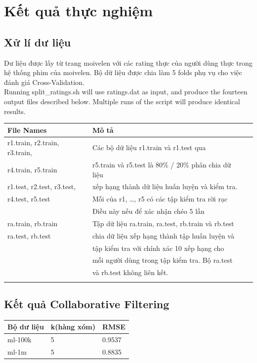 \documentclass[a4paper,11pt]{report}
\begin{document}
\chapter{Kết quả thực nghiệm}
\section{Xử lí dư liệu}
Dư liệu được lấy từ  trang moivelen với các rating thực của người dùng thực trong hệ thống phim của moivelen. Bộ dữ liệu được chia làm 5 folds phụ vụ cho việc đánh giá Cross-Validation. \\
Running split\_ratings.sh will use ratings.dat as input, and produce the fourteen output files described below. Multiple runs of the script will produce identical results. \\
\begin{center}
\begin{longtable}{|l|l|l|} 
\hline
File Names & Mô tả  \\
\hline
r1.train, r2.train, r3.train, & Các bộ dữ liệu r1.train và r1.test qua \\
r4.train, r5.train &  r5.train và r5.test là 80\% / 20\% phân chia dữ liệu \\
r1.test, r2.test, r3.test, & xếp hạng thành dữ liệu huấn luyện và kiểm tra. \\
r4.test, r5.test & Mỗi của r1, \ldots, r5 có các tập kiểm tra rời rạc \\
& Điều này nếu để xác nhận chéo 5 lần \\
\hline
ra.train, rb.train & Tập dữ liệu ra.train, ra.test, rb.train và rb.test\\ 
ra.test, rb.test & chia dữ liệu xếp hạng thành tập huấn luyện và \\
				& tập kiểm tra với chính xác 10 xếp hạng cho\\
				&  mỗi người dùng trong tập kiểm tra. Bộ ra.test \\
				&  và rb.test không liên kết.\\
				& \\
				\hline
\end{longtable}
\end{center}
\section{Kết quả Collaborative Filtering}
\begin{center}
\begin{longtable}{|l|l|l|}
\hline
Bộ dư liệu & k(hàng xóm) & RMSE \\ 
\hline
ml-100k & 5 & 0.9537 \\
ml-1m & 5 & 0.8835 \\
\hline
\end{longtable}
\end{center}
\end{document}
